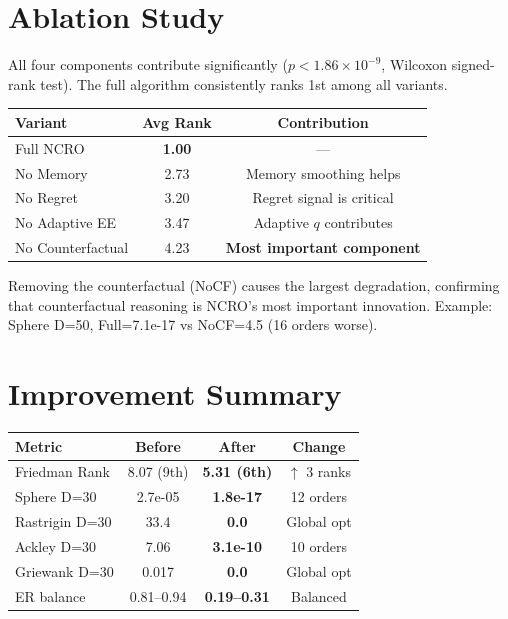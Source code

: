 \documentclass[10pt,twocolumn]{article}
\begin{document}
\section{Ablation Study}

All four components contribute significantly ($p < 1.86 \times 10^{-9}$, Wilcoxon signed-rank test). The full algorithm consistently ranks 1st among all variants.

\begin{center}
\begin{tabular}{lcc}
\toprule
Variant & Avg Rank & Contribution \\
\midrule
Full NCRO & \textbf{1.00} & --- \\
No Memory & 2.73 & Memory smoothing helps \\
No Regret & 3.20 & Regret signal is critical \\
No Adaptive EE & 3.47 & Adaptive $q$ contributes \\
No Counterfactual & 4.23 & \textbf{Most important component} \\
\bottomrule
\end{tabular}
\end{center}

Removing the counterfactual (NoCF) causes the largest degradation, confirming that counterfactual reasoning is NCRO's most important innovation. Example: Sphere D=50, Full=7.1e-17 vs NoCF=4.5 (16 orders worse).

\section{Improvement Summary}

\begin{center}
\begin{tabular}{lccc}
\toprule
Metric & Before & After & Change \\
\midrule
Friedman Rank & 8.07 (9th) & \textbf{5.31 (6th)} & $\uparrow$ 3 ranks \\
Sphere D=30 & 2.7e-05 & \textbf{1.8e-17} & 12 orders \\
Rastrigin D=30 & 33.4 & \textbf{0.0} & Global opt \\
Ackley D=30 & 7.06 & \textbf{3.1e-10} & 10 orders \\
Griewank D=30 & 0.017 & \textbf{0.0} & Global opt \\
ER balance & 0.81--0.94 & \textbf{0.19--0.31} & Balanced \\
\bottomrule
\end{tabular}
\end{center}
\end{document}
